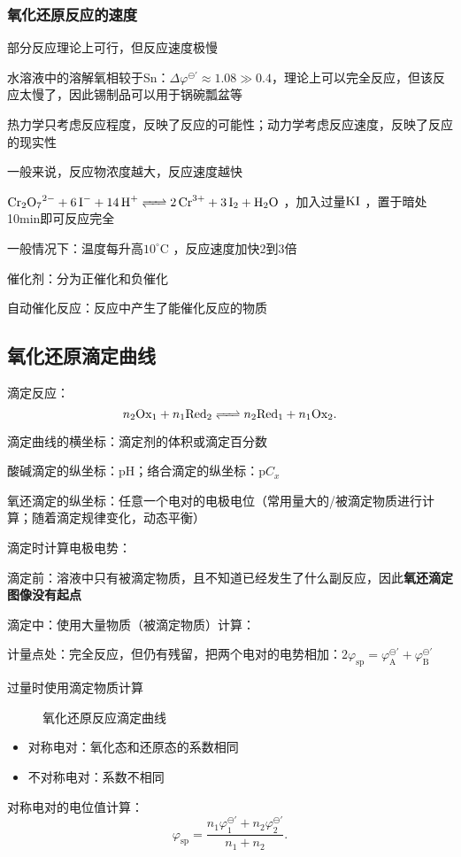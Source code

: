 \subsubsection*{氧化还原反应的速度}%
\label{subsub:氧化还原反应的速度}
\begin{notation}
    部分反应理论上可行，但反应速度极慢
\end{notation}
\begin{eg}
    水溶液中的溶解氧相较于Sn：$\Delta\varphi^{\ominus '}\approx 1.08\gg 0.4$，理论上可以完全反应，但该反应太慢了，因此锡制品可以用于锅碗瓢盆等
\end{eg}
\begin{notation}
热力学只考虑反应程度，反映了反应的可能性；动力学考虑反应速度，反映了反应的现实性
\end{notation}
一般来说，反应物浓度越大，反应速度越快
\begin{eg}
$\ce{Cr_2O_7^2- +6I- +14H+} \ce{<=>[][]} \ce{2Cr^3+ +3I_2 +H_2O}$ ，加入过量$\ce{KI}$ ，置于暗处10min即可反应完全
\end{eg}
\begin{notation}
一般情况下：温度每升高$10^\circ\text{C}$ ，反应速度加快2到3倍
\end{notation}
催化剂：分为正催化和负催化
\begin{notation}
    自动催化反应：反应中产生了能催化反应的物质
\end{notation}
\subsection{氧化还原滴定曲线}%
\label{sub:氧化还原滴定曲线}
滴定反应：
\[
    n_2\ce{Ox_1}+n_1\ce{Red_2} \ce{<=>[][]}n_2\ce{Red_1} + n_1\ce{Ox_2}
.\]
\begin{notation}
滴定曲线的横坐标：滴定剂的体积或滴定百分数

酸碱滴定的纵坐标：pH；络合滴定的纵坐标：$\text{p}C_x $

氧还滴定的纵坐标：任意一个电对的电极电位（常用量大的/被滴定物质进行计算；随着滴定规律变化，动态平衡）
\end{notation}
滴定时计算电极电势：

滴定前：溶液中只有被滴定物质，且不知道已经发生了什么副反应，因此\textbf{氧还滴定图像没有起点}

滴定中：使用大量物质（被滴定物质）计算：

计量点处：完全反应，但仍有残留，把两个电对的电势相加：$2\varphi_\text{sp}=\varphi_\text{A}^{\ominus'} +\varphi_\text{B}^{\ominus'} $

过量时使用滴定物质计算
\begin{figure}[ht]
    \centering
    \caption{氧化还原反应滴定曲线}
    \label{fig:氧化还原反应滴定曲线}
\end{figure}
\begin{itemize}
    \item 对称电对：氧化态和还原态的系数相同
    \item 不对称电对：系数不相同
\end{itemize}
对称电对的电位值计算：\[
    \varphi_\text{sp}=\frac{n_1\varphi_1 ^{\ominus'} +n_2\varphi_2 ^{\ominus'} }{n_1+n_2}
.\]
